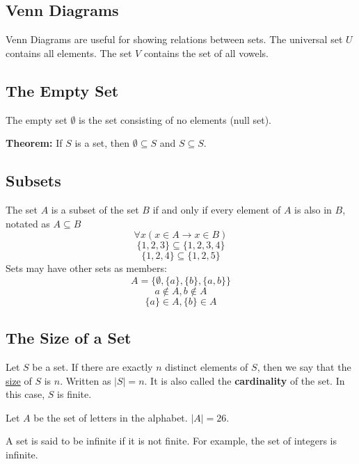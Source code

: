 \documentclass[letterpaper, 12pt]{math}
\begin{document}
\subsection*{Venn Diagrams}
Venn Diagrams are useful for showing relations between sets. The universal
set \( U \) contains all elements. The set \( V \) contains the set of all
vowels.
\begin{center}
\end{center}

\subsection*{The Empty Set}
The empty set \( \emptyset \) is the set consisting of no elements (null set).
\par
\textbf{Theorem:} If \( S \) is a set, then \( \emptyset \subseteq S \) and
\( S \subseteq S \).

\subsection*{Subsets}
The set \( A \) is a subset of the set \( B \) if and only if every element of
\( A \) is also in \( B \), notated as \( A \subseteq B \)
\[ \forall{x}(x \in A \to x \in B) \]
\[ \bigg\{1,2,3\bigg\} \subseteq \bigg\{1,2,3,4\bigg\} \]
\[ \bigg\{1,2,4\bigg\} \subseteq \bigg\{1,2,5\bigg\} \]
Sets may have other sets as members:
\[ A = \{\emptyset, \{a\}, \{b\}, \{a,b\}\} \]
\[ a \notin A, b \notin A \]
\[ \{a\} \in A, \{b\} \in A \]

\subsection*{The Size of a Set}
Let \( S \) be a set. If there are exactly \( n \) distinct elements of \( S \),
then we say that the \underline{size} of \( S \) is \( n \). Written as
\( |S| = n \). It is also called the \textbf{cardinality} of the set. In this
case, \( S \) is finite. \par
Let \( A \) be the set of letters in the alphabet. \( |A| = 26 \). \par
A set is said to be infinite if it is not finite. For example, the set of
integers is infinite.
\end{document}
